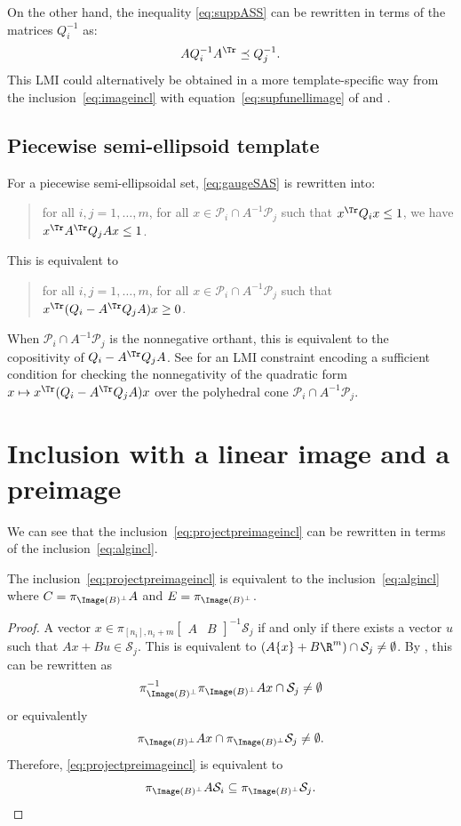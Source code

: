 \documentclass[11pt,twoside,a4paper,openright]{uclouvain-thesis}
\newcommand{\piB}{\pi_{\Image(B)^\perp}}
\newcommand{\piBinv}{\pi_{\Image(B)^\perp}^{-1}}
\begin{document}
On the other hand, the inequality \eqref{eq:suppASS}
can be rewritten in terms of the matrices $Q_i^{-1}$ as:
\begin{equation*}
  A Q_i^{-1} A^{\Tr} \preceq Q_j^{-1}.
\end{equation*}
This LMI could alternatively be obtained in a more template-specific way from the inclusion~\eqref{eq:imageincl}
with equation~\eqref{eq:supfunellimage} of  and .

\subsection{Piecewise semi-ellipsoid template}
For a piecewise semi-ellipsoidal set, \eqref{eq:gaugeSAS} is rewritten into:
\begin{quote}
  for all $i, j = 1, \ldots, m$, for all $x \in \mathcal{P}_i \cap A^{-1}\mathcal{P}_j$ such that $x^\Tr Q_i x \leq 1$,
  we have $x^\Tr A^\Tr Q_j A x \leq 1$.
\end{quote}
This is equivalent to
\begin{quote}
  for all $i, j = 1, \ldots, m$, for all $x \in \mathcal{P}_i \cap A^{-1}\mathcal{P}_j$ such that $x^\Tr (Q_i - A^\Tr Q_j A) x \geq 0$.
\end{quote}
When $\mathcal{P}_i \cap A^{-1}\mathcal{P}_j$ is the nonnegative orthant, this is equivalent to the copositivity of $Q_i - A^\Tr Q_j A$.
See  for an LMI constraint encoding a sufficient condition for checking the nonnegativity of the quadratic form $x \mapsto x^\Tr (Q_i - A^\Tr Q_j A) x$
over the polyhedral cone $\mathcal{P}_i \cap A^{-1}\mathcal{P}_j$.

\section{Inclusion with a linear image and a preimage}
\label{sec:preimage}

We can see that the inclusion~\eqref{eq:projectpreimageincl} can be rewritten in terms
of the inclusion~\eqref{eq:algincl}.
\begin{myprop}
  \label{prop:projectalg}
  The inclusion~\eqref{eq:projectpreimageincl} is equivalent to the inclusion~\eqref{eq:algincl}
  where $C = \piB{} A$ and $E = \piB{}$.
  \begin{proof}
    A vector $x \in \pi_{[n_i], n_i + m} \begin{bmatrix}
      A & B
    \end{bmatrix}^{-1} \mathcal{S}_j$
    if and only if there exists a vector $u$ such that
    $Ax + Bu \in \mathcal{S}_j$.
    This is equivalent to $(A\{x\} + B\R^m) \cap \mathcal{S}_j \neq \emptyset$.
    By , this can be rewritten as
    \[ \piBinv{}\piB{}Ax \cap \mathcal{S}_j \neq \emptyset \]
    or equivalently
    \[ \piB{}Ax \cap \piB{}\mathcal{S}_j \neq \emptyset. \]
    Therefore, \eqref{eq:projectpreimageincl} is equivalent to
    \[ \piB{}A\mathcal{S}_i \subseteq \piB{}\mathcal{S}_j. \]
  \end{proof}
\end{myprop}
\end{document}
